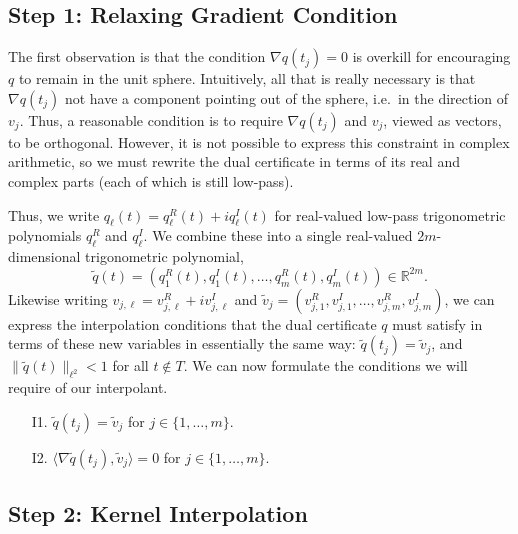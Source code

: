 \documentclass[11pt]{article}
\newcommand{\ra}{\rangle}
\newcommand{\la}{\langle}
\newcommand{\RR}{\mathbb{R}}
\begin{document}
\subsection{Step 1: Relaxing Gradient Condition}

The first observation is that the condition $\nabla q(t_j) = 0$ is overkill for encouraging $q$ to remain in the unit sphere.
Intuitively, all that is really necessary is that $\nabla q(t_j)$ not have a component pointing out of the sphere, i.e.\ in the direction of $v_j$.
Thus, a reasonable condition is to require $\nabla q(t_j)$ and $v_j$, viewed as vectors, to be orthogonal.
However, it is not possible to express this constraint in complex arithmetic, so we must rewrite the dual certificate in terms of its real and complex parts (each of which is still low-pass).

Thus, we write $q_\ell(t) = q_\ell^R(t) + iq_\ell^I(t)$ for real-valued low-pass trigonometric polynomials $q_\ell^R$ and $q_\ell^I$.
We combine these into a single real-valued $2m$-dimensional trigonometric polynomial,
\begin{equation}
    \tilde{q}(t) = (q_1^R(t), q_1^I(t), \dots, q_m^R(t), q_m^I(t)) \in \RR^{2m}.
\end{equation}
Likewise writing $v_{j, \ell} = v_{j, \ell}^R + iv_{j, \ell}^I$ and $\tilde{v}_j = (v_{j, 1}^R, v_{j, 1}^I, \dots, v_{j, m}^R, v_{j, m}^I)$, we can express the interpolation conditions that the dual certificate $q$ must satisfy in terms of these new variables in essentially the same way: $\tilde{q}(t_j) = \tilde{v}_j$, and $\|\tilde{q}(t)\|_{\ell^2} < 1$ for all $t \notin T$.
We can now formulate the conditions we will require of our interpolant.
\begin{enumerate}
\item[I1.] $\tilde{q}(t_j) = \tilde{v}_j$ for $j \in \{1, \dots, m\}$.
\item[I2.] $\la \nabla \tilde{q}(t_j), \tilde{v}_j \ra = 0$ for $j \in \{1, \dots, m\}$.
\end{enumerate}

\subsection{Step 2: Kernel Interpolation}
\end{document}
